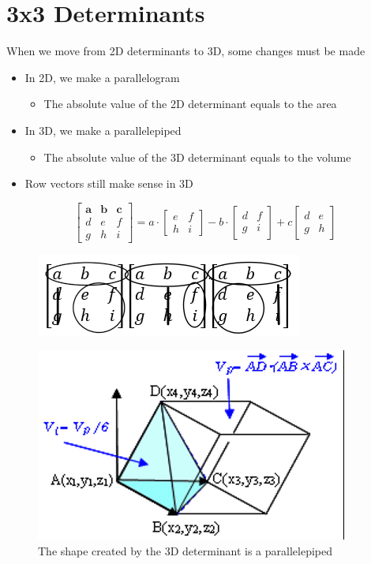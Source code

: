 \documentclass{article}
\begin{document}
\section{3x3 Determinants}
When we move from 2D determinants to 3D, some changes must be made
\begin{itemize}
    
    \item In 2D, we make a parallelogram
    \begin{itemize}
        \item The absolute value of the 2D determinant equals to the area
    \end{itemize}
    \item In 3D, we make a parallelepiped
    \begin{itemize}
        \item The absolute value of the 3D determinant equals to the volume
    \end{itemize}
    \item Row vectors still make sense in 3D
\end{itemize}

\[\begin{bmatrix}
    \boldsymbol{a}&\boldsymbol{b}&\boldsymbol{c}\\
    d&e&f\\
    g&h&i
\end{bmatrix}=a\cdot\begin{bmatrix}
    e&f\\h&i
\end{bmatrix}-b\cdot\begin{bmatrix}
    d&f\\
    g&i
\end{bmatrix}+c\begin{bmatrix}
    d&e\\
    g&h
\end{bmatrix}\]


\begin{figure}[h!]
    \centering
    \includegraphics[scale=1]{derive3D-DeterminantForm.png}
    \label{}
\end{figure}

\begin{figure}[h!]
    \centering
    \includegraphics[scale=1]{parallelepiped.png}
    \caption{The shape created by the 3D determinant is a parallelepiped}
    \label{}
\end{figure}
\end{document}

